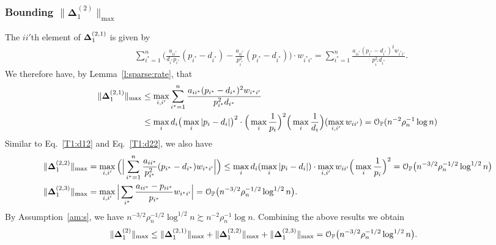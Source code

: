\documentclass[10pt,journal,compsoc]{IEEEtran}
\newcommand{\op}{\mathcal{O}_{\mathbb{P}}}
\newcommand{\ee}{\end{aligned} \end{equation}}
\newcommand{\BL}{\Big (}
\newcommand{\BR}{\Big )}
\newcommand{\bee}{\begin{equation}\begin{aligned}}
\newcommand{\M}[1]{{{\mathbf{\MakeUppercase{#1}}}}}
\numberwithin{equation}{section}
\begin{document}
\subsubsection{Bounding $\|\mathbf\Delta_{1}^{(2)}\|_{\max}$}\label{app:ts:dt:2}
The $ii'$th element of $\M \Delta^{(2,1)}_{1}$ is given by
\bee\nonumber
&\sum_{i^* = 1}^{n}\Big(\frac{a_{ii^*}}{d_{i^*} p_{i^*}}(p_{i^*} - d_{i^*}) - \frac{a_{ii^*}}{p_{i^*}^2}(p_{i^*} - d_{i^*})\Big)\cdot w_{i^{*}{i'}} 
= \sum_{i^* = 1}^{n} \frac{a_{ii^*}(p_{i^*} - d_{i^*})^2 w_{i^{*}{i'}}}{p_{i^*}^2 d_{i^*}}.
\ee
We therefore have, by Lemma~\ref{l:sparse:rate}, that
\bee\nonumber
\|\M \Delta^{(2,1)}_{1}\|_{\max} 
&\leq \max_{i,{i'}}\sum_{i^* = 1}^{n} \frac{a_{ii^*}(p_{i^*} - d_{i^*})^2w_{i^{*}{i'}}}{p_{i^*}^2 d_{i^*}}
\\
&\leq \max_{i}d_i\big(\max_{i}|p_i - d_i|\big)^2
\cdot \BL\max_{i}\frac{1}{p_i}\BR^2\BL\max_{i}\frac{1}{d_i}\BR(\max_{i,{i'}}w_{ii'})
= \op(n^{-2}\rho_n^{-1} \log n)
\ee
Similar to Eq.~\eqref{T1:d12} and Eq.~\eqref{T1:d22}, we also have
\bee\nonumber
\|\M \Delta^{(2,2)}_{1}\|_{\max} 
&= \max_{i,{i'}}\BL \Big|\sum_{i^* = 1}^{n}\frac{a_{ii^*}}{p_{i^*}^2}(p_{i^*} - d_{i^*})w_{i^{*}{i'}}\Big|\BR
\leq \max_i d_i (\max_{i} |p_i - d_i|) \cdot \max_{i,{i'}}w_{ii'}  \BL \max_{i}\frac{1}{p_i}\BR^2 =\op\big(n^{-3/2}\rho_n^{-1/2}\log^{1/2}{n}\big) \\
\|\M \Delta^{(2,3)}_{1}\|_{\max} 
&=\max_{i,{i'}}\Big|\sum_{i^*}\frac{a_{ii^*}- p_{ii^*}}{p_{i^*}}w_{i^{*}{i'}}\Big|=
\op\big(n^{-3/2}\rho_n^{-1/2}\log^{1/2}{n}\big).
\ee
By Assumption~\ref{am:s}, we have $n^{-3/2}\rho_n^{-1/2} \log^{1/2}{n} \succsim n^{-2}\rho_n^{-1}{\log n}$. Combining the above results we obtain \bee\label{T1:order_2_2:s}
\|\M \Delta_{1}^{(2)}\|_{\max} &\leq \|\M \Delta_{1}^{(2,1)}\|_{\max} + \|\M \Delta_{1}^{(2,2)}\|_{\max} + \|\M \Delta_{1}^{(2,3)}\|_{\max} 
= \op
\big(n^{-3/2}\rho_n^{-1/2} \log^{1/2}{n}\big).
\ee
\end{document}
